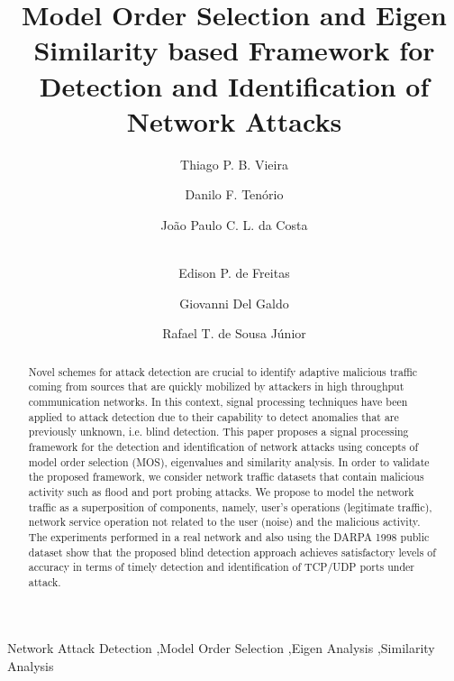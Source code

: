 \documentclass[review]{elsarticle}
\begin{document}
\begin{frontmatter}

\title{Model Order Selection and Eigen Similarity based Framework for Detection and Identification of Network Attacks}

\author[unbaddress]{Thiago P. B. Vieira}
\author[unbaddress]{Danilo F. Tenório}
\author[unbaddress,Ilmenauaddress,Fraunhoferaddress]{João Paulo C. L. da Costa}
\author[ufrgsaddress]{\\Edison P. de Freitas}
\author[Ilmenauaddress,Fraunhoferaddress]{Giovanni Del Galdo}
\author[unbaddress]{Rafael T. de Sousa Júnior}

\address[unbaddress]{Department of Electrical Engineering, University of Brasilia (UnB), 70910-900, Brasília-DF, Brazil}
\address[Ilmenauaddress]{Institute for Information Technology, Ilmenau University of Technology, Ilmenau, Germany}
\address[Fraunhoferaddress]{Fraunhofer Institute for Integrated Circuits IIS, Erlangen, Germany}
\address[ufrgsaddress]{Graduate Program in Electrical Engineering, Federal University of Rio Grande do Sul (UFRGS), 90035-190, Porto Alegre, Brazil}


\begin{abstract}
Novel schemes for attack detection are crucial to identify adaptive malicious traffic coming from sources that are quickly mobilized by attackers in high throughput communication networks. In this context, signal processing techniques have been applied to attack detection due to their capability to detect anomalies that are previously unknown, i.e. blind detection. This paper proposes a signal processing framework for the detection and identification of network attacks using concepts of model order selection (MOS), eigenvalues and similarity analysis. In order to validate the proposed framework, we consider network traffic datasets that contain malicious activity such as flood and port probing attacks. We propose to model the network traffic as a superposition of components, namely, user's operations (legitimate traffic), network service operation not related to the user (noise) and the malicious activity. The experiments performed in a real network and also using the DARPA 1998 public dataset show that the proposed blind detection approach achieves satisfactory levels of accuracy in terms of timely detection and identification of TCP/UDP ports under attack.
\end{abstract}

\begin{keyword}
Network Attack Detection \sep Model Order Selection \sep Eigen Analysis \sep Similarity Analysis
\end{keyword}

\end{frontmatter}
\end{document}
